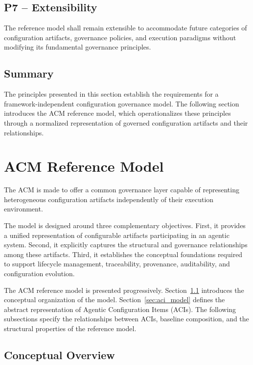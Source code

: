 \documentclass[10pt]{article}
\begin{document}
\subsection{P7 -- Extensibility}

The reference model shall remain extensible to accommodate future categories of configuration artifacts, governance policies, and execution paradigms without modifying its fundamental governance principles.

\subsection*{Summary}

The principles presented in this section establish the requirements for a framework-independent configuration governance model. The following section introduces the ACM reference model, which operationalizes these principles through a normalized representation of governed configuration artifacts and their relationships.

\section{ACM Reference Model}
\label{sec:reference_model}

The ACM is made to offer a common governance layer capable of representing heterogeneous configuration artifacts independently of their execution environment.

The model is designed around three complementary objectives. First, it provides a unified representation of configurable artifacts participating in an agentic system. Second, it explicitly captures the structural and governance relationships among these artifacts. Third, it establishes the conceptual foundations required to support lifecycle management, traceability, provenance, auditability, and configuration evolution.

The ACM reference model is presented progressively. Section~\ref{sec:conceptual_overview} introduces the conceptual organization of the model. Section~\ref{sec:aci_model} defines the abstract representation of Agentic Configuration Items (ACIs). The following subsections specify the relationships between ACIs, baseline composition, and the structural properties of the reference model.

\subsection{Conceptual Overview}
\label{sec:conceptual_overview}
\end{document}
